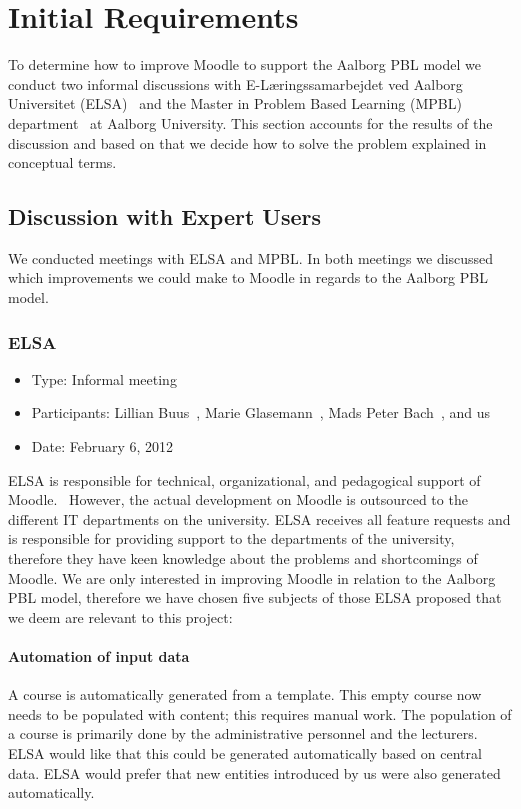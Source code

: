 \chapter{Initial Requirements}
\label{sec:initialAnalysis}
To determine how to improve Moodle to support the Aalborg PBL model we conduct two informal discussions with E-L\ae{}ringssamarbejdet ved Aalborg Universitet (ELSA)~\cite{elsa} and the Master in Problem Based Learning (MPBL) department~\cite{mpbl} at Aalborg University.
This section accounts for the results of the discussion and based on that we decide how to solve the problem explained in conceptual terms.

\section{Discussion with Expert Users}  
\label{sub:expertUsers} 
We conducted meetings with ELSA and MPBL. 
In both meetings we discussed which improvements we could make to Moodle in regards to the Aalborg PBL model.

\subsection{ELSA}
\label{sub:elsaInterview}
\begin{itemize}
	\item Type: Informal meeting
	\item Participants: Lillian Buus~\cite{lillian}, Marie Glasemann~\cite{marie}, Mads Peter Bach~\cite{mads}, and us 
	\item Date: February 6, 2012
\end{itemize}
ELSA is responsible for technical, organizational, and pedagogical support of Moodle.~\cite{elsa} 
However, the actual development on Moodle is outsourced to the different IT departments on the university. 
ELSA receives all feature requests and is responsible for providing support to the departments of the university, therefore they have keen knowledge about the problems and shortcomings of Moodle. 
We are only interested in improving Moodle in relation to the Aalborg PBL model, therefore we have chosen five subjects of those ELSA proposed that we deem are relevant to this project:

\subsubsection{Automation of input data} A course is automatically generated from a template. 
This empty course now needs to be populated with content; this requires manual work. 
The population of a course is primarily done by the administrative personnel and the lecturers. 
ELSA would like that this could be generated automatically based on central data. 
ELSA would prefer that new entities introduced by us were also generated automatically.

